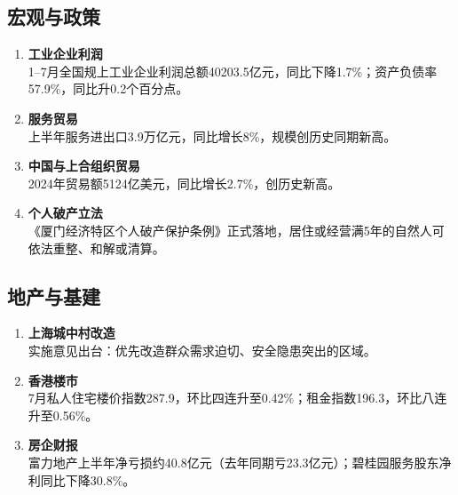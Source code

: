\subsection{宏观与政策}
\begin{enumerate}[leftmargin=*, nosep]
    \item \textbf{工业企业利润}  \\
    1–7月{\color{red}全国规上工业企业}利润总额40203.5亿元，同比下降1.7\%；资产负债率57.9\%，同比升0.2个百分点。
    \item \textbf{服务贸易}  \\
    上半年服务进出口3.9万亿元，同比增长8\%，规模创历史同期新高。
    \item \textbf{中国与上合组织贸易}  \\
    2024年贸易额5124亿美元，同比增长2.7\%，创历史新高。
    \item \textbf{个人破产立法}  \\
    {\color{red}《厦门经济特区个人破产保护条例》}正式落地，居住或经营满5年的自然人可依法重整、和解或清算。
\end{enumerate}

\subsection{地产与基建}
\begin{enumerate}[leftmargin=*, nosep]
    \item \textbf{上海城中村改造}  \\
    实施意见出台：优先改造群众需求迫切、安全隐患突出的区域。
    \item \textbf{香港楼市}  \\
    7月私人住宅楼价指数287.9，环比四连升至0.42\%；租金指数196.3，环比八连升至0.56\%。
    \item \textbf{房企财报}  \\
    富力地产上半年净亏损约40.8亿元（去年同期亏23.3亿元）；碧桂园服务股东净利同比下降30.8\%。
\end{enumerate}

